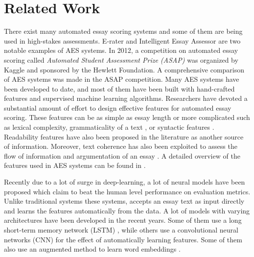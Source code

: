 \documentclass[11pt,a4paper]{article}
\begin{document}


\section{Related Work}

There exist many automated essay scoring systems \cite{shermis2013handbook} and some of them are being used in high-stakes assessments. E-rater \cite{attali2004automated} and Intelligent Essay Assessor \cite{foltz1999intelligent} are two notable examples of AES systems. In 2012, a competition on automated essay scoring called \textit{Automated Student Assessment Prize (ASAP)} was organized by Kaggle and sponsored by the Hewlett Foundation. A comprehensive comparison of AES systems was made in the ASAP competition. Many AES systems have been developed to date, and most of them have been built with hand-crafted features and supervised machine learning algorithms. Researchers have devoted a substantial amount of effort to design effective features for automated essay scoring. These features can be as simple as essay length \cite{chen2013automated} or more complicated such as lexical complexity, grammaticality of a text \cite{attali2004automated}, or syntactic features \cite{chen2013automated}. Readability features \cite{zesch2015task} have also been proposed in the literature as another source of information. Moreover, text coherence has also been exploited to assess the flow of information and argumentation of an essay \cite{chen2013automated}. A detailed overview of the features used in AES systems can be found in \cite{zesch2015task}. 

Recently due to a lot of surge in deep-learning, a lot of neural models have been proposed which claim to beat the human level performance on evaluation metrics. Unlike traditional systems these systems, accepts an essay text as input directly and learns the features automatically from the data. A lot of models with varying architectures have been developed in the recent years. Some of them use a long short-term memory network (LSTM) \cite{taghipour2016neural}, while others use a convolutional neural networks (CNN) \cite{dong2016automatic} for the effect of automatically learning features. Some of them also use an augmented method to learn word embeddings \cite{alikaniotis2016automatic}. 
\end{document}

